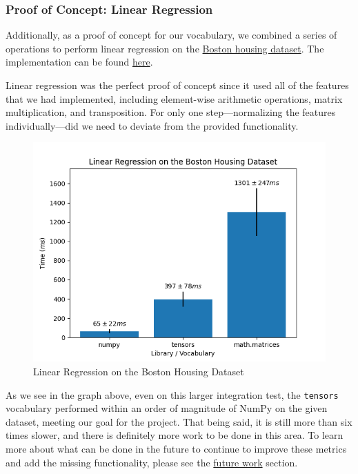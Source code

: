 \documentclass[
]{article}
\begin{document}
\hypertarget{proof-of-concept-linear-regression}{%
\subsubsection{Proof of Concept: Linear
Regression}\label{proof-of-concept-linear-regression}}

Additionally, as a proof of concept for our vocabulary, we combined a
series of operations to perform linear regression on the
\href{https://www.cs.toronto.edu/~delve/data/boston/bostonDetail.html}{Boston
housing dataset}. The implementation can be found
\href{https://github.com/factor/factor/blob/master/extra/tensors/demos/demos.factor}{here}.

Linear regression was the perfect proof of concept since it used all of
the features that we had implemented, including element-wise arithmetic
operations, matrix multiplication, and transposition. For only one
step---normalizing the features individually---did we need to deviate
from the provided functionality.

\begin{figure}
\centering
\includegraphics{linear_regression.png}
\caption{Linear Regression on the Boston Housing Dataset}
\end{figure}

As we see in the graph above, even on this larger integration test, the
\texttt{tensors} vocabulary performed within an order of magnitude of
NumPy on the given dataset, meeting our goal for the project. That being
said, it is still more than six times slower, and there is definitely
more work to be done in this area. To learn more about what can be done
in the future to continue to improve these metrics and add the missing
functionality, please see the \href{future.md}{future work} section.
\end{document}
